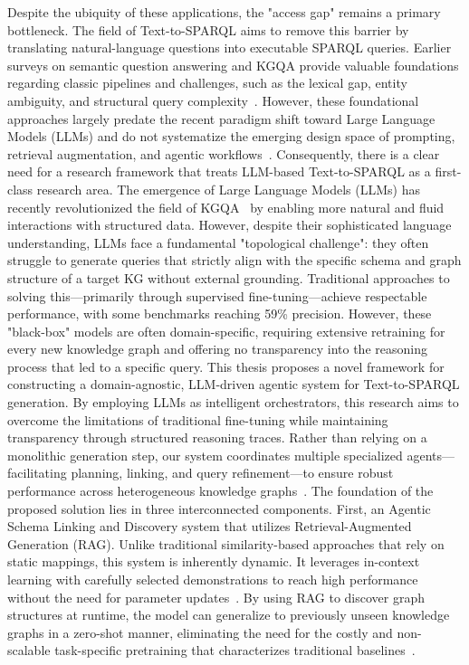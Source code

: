 Despite the ubiquity of these applications, the "access gap" remains a primary bottleneck. The field of Text-to-SPARQL aims to remove this barrier by translating natural-language questions into executable SPARQL queries. Earlier surveys on semantic question answering and KGQA provide valuable foundations regarding classic pipelines and challenges, such as the lexical gap, entity ambiguity, and structural query complexity~\cite{hoffner_survey_2017, diefenbach_core_2018}. However, these foundational approaches largely predate the recent paradigm shift toward Large Language Models (LLMs) and do not systematize the emerging design space of prompting, retrieval augmentation, and agentic workflows~\cite{dimitrakis_survey_2020, antoniou_survey_2022}. Consequently, there is a clear need for a research framework that treats LLM-based Text-to-SPARQL as a first-class research area.
The emergence of Large Language Models (LLMs) has recently revolutionized the field of KGQA~\cite{dabramo_investigating_2025, meloni_exploring_2025} by enabling more natural and fluid interactions with structured data. However, despite their sophisticated language understanding, LLMs face a fundamental "topological challenge": they often struggle to generate queries that strictly align with the specific schema and graph structure of a target KG without external grounding. Traditional approaches to solving this—primarily through supervised fine-tuning—achieve respectable performance, with some benchmarks reaching 59\% precision. However, these "black-box" models are often domain-specific, requiring extensive retraining for every new knowledge graph and offering no transparency into the reasoning process that led to a specific query.
This thesis proposes a novel framework for constructing a domain-agnostic, LLM-driven agentic system for Text-to-SPARQL generation. By employing LLMs as intelligent orchestrators, this research aims to overcome the limitations of traditional fine-tuning while maintaining transparency through structured reasoning traces. Rather than relying on a monolithic generation step, our system coordinates multiple specialized agents—facilitating planning, linking, and query refinement—to ensure robust performance across heterogeneous knowledge graphs~\cite{perevalov_text--sparql_2025, zhao_agentict2srobust_2025}.
The foundation of the proposed solution lies in three interconnected components. First, an Agentic Schema Linking and Discovery system that utilizes Retrieval-Augmented Generation (RAG). Unlike traditional similarity-based approaches that rely on static mappings, this system is inherently dynamic. It leverages in-context learning with carefully selected demonstrations to reach high performance without the need for parameter updates~\cite{dabramo_investigating_2025}. By using RAG to discover graph structures at runtime, the model can generalize to previously unseen knowledge graphs in a zero-shot manner, eliminating the need for the costly and non-scalable task-specific pretraining that characterizes traditional baselines~\cite{brei_leveraging_2024}.
